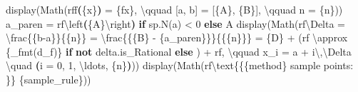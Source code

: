 \documentclass[
  letterpaper,
  DIV=11,
  numbers=noendperiod]{scrreprt}
\newenvironment{Shaded}{\begin{snugshade}}{\end{snugshade}}
\newcommand{\CharTok}[1]{\textcolor[rgb]{0.13,0.47,0.30}{#1}}
\newcommand{\ControlFlowTok}[1]{\textcolor[rgb]{0.00,0.23,0.31}{\textbf{#1}}}
\newcommand{\DecValTok}[1]{\textcolor[rgb]{0.68,0.00,0.00}{#1}}
\newcommand{\ErrorTok}[1]{\textcolor[rgb]{0.68,0.00,0.00}{#1}}
\newcommand{\KeywordTok}[1]{\textcolor[rgb]{0.00,0.23,0.31}{\textbf{#1}}}
\newcommand{\NormalTok}[1]{\textcolor[rgb]{0.00,0.23,0.31}{#1}}
\newcommand{\OperatorTok}[1]{\textcolor[rgb]{0.37,0.37,0.37}{#1}}
\newcommand{\PreprocessorTok}[1]{\textcolor[rgb]{0.68,0.00,0.00}{#1}}
\newcommand{\SpecialCharTok}[1]{\textcolor[rgb]{0.37,0.37,0.37}{#1}}
\newcommand{\StringTok}[1]{\textcolor[rgb]{0.13,0.47,0.30}{#1}}
\newcommand{\VerbatimStringTok}[1]{\textcolor[rgb]{0.13,0.47,0.30}{#1}}
\theoremstyle{plain}
\theoremstyle{plain}
\theoremstyle{definition}
\theoremstyle{definition}
\theoremstyle{definition}
\theoremstyle{plain}
\theoremstyle{plain}
\theoremstyle{remark}
\begin{document}
\begin{Shaded}
\begin{Highlighting}[]
\NormalTok{    display(Math(}\VerbatimStringTok{rf\textquotesingle{}f}\KeywordTok{(}\SpecialCharTok{\{}\NormalTok{x}\SpecialCharTok{\}}\KeywordTok{)}\VerbatimStringTok{ = }\SpecialCharTok{\{}\NormalTok{fx}\SpecialCharTok{\}}\VerbatimStringTok{, }\ErrorTok{\textbackslash{}}\VerbatimStringTok{qquad }\PreprocessorTok{[a, b]}\VerbatimStringTok{ = }\PreprocessorTok{[}\SpecialCharTok{\{}\NormalTok{A}\SpecialCharTok{\}}\PreprocessorTok{, }\SpecialCharTok{\{}\NormalTok{B}\SpecialCharTok{\}}\PreprocessorTok{]}\VerbatimStringTok{, }\ErrorTok{\textbackslash{}}\VerbatimStringTok{qquad n = }\SpecialCharTok{\{}\NormalTok{n}\SpecialCharTok{\}}\VerbatimStringTok{\textquotesingle{}}\NormalTok{))}
\NormalTok{    a\_paren }\OperatorTok{=} \VerbatimStringTok{rf\textquotesingle{}}\ErrorTok{\textbackslash{}}\VerbatimStringTok{left}\KeywordTok{(}\SpecialCharTok{\{}\NormalTok{A}\SpecialCharTok{\}}\CharTok{\textbackslash{}r}\VerbatimStringTok{ight}\KeywordTok{)}\VerbatimStringTok{\textquotesingle{}} \ControlFlowTok{if}\NormalTok{ sp.N(a) }\OperatorTok{\textless{}} \DecValTok{0} \ControlFlowTok{else}\NormalTok{ A}
\NormalTok{    display(Math(}\VerbatimStringTok{rf\textquotesingle{}}\DecValTok{\textbackslash{}D}\VerbatimStringTok{elta = }\CharTok{\textbackslash{}f}\VerbatimStringTok{rac}\CharTok{\{\{}\VerbatimStringTok{b{-}a}\CharTok{\}\}\{\{}\VerbatimStringTok{n}\CharTok{\}\}}\VerbatimStringTok{ = }\CharTok{\textbackslash{}f}\VerbatimStringTok{rac}\CharTok{\{\{}\SpecialCharTok{\{}\NormalTok{B}\SpecialCharTok{\}}\VerbatimStringTok{ {-} }\SpecialCharTok{\{}\NormalTok{a\_paren}\SpecialCharTok{\}}\CharTok{\}\}\{\{}\SpecialCharTok{\{}\NormalTok{n}\SpecialCharTok{\}}\CharTok{\}\}}\VerbatimStringTok{ = }\SpecialCharTok{\{}\NormalTok{D}\SpecialCharTok{\}}\VerbatimStringTok{\textquotesingle{}}
                 \OperatorTok{+}\NormalTok{ (}\VerbatimStringTok{rf\textquotesingle{} }\CharTok{\textbackslash{}a}\VerbatimStringTok{pprox }\SpecialCharTok{\{}\NormalTok{\_fmt(d\_f)}\SpecialCharTok{\}}\VerbatimStringTok{\textquotesingle{}} \ControlFlowTok{if} \KeywordTok{not}\NormalTok{ delta.is\_Rational }\ControlFlowTok{else} \StringTok{\textquotesingle{}\textquotesingle{}}\NormalTok{)}
                 \OperatorTok{+} \VerbatimStringTok{rf\textquotesingle{}, }\ErrorTok{\textbackslash{}}\VerbatimStringTok{qquad x\_i = a }\OperatorTok{+}\VerbatimStringTok{ i}\CharTok{\textbackslash{},}\DecValTok{\textbackslash{}D}\VerbatimStringTok{elta }\ErrorTok{\textbackslash{}}\VerbatimStringTok{quad }\KeywordTok{(}\VerbatimStringTok{i = 0, 1, }\ErrorTok{\textbackslash{}}\VerbatimStringTok{ldots, }\SpecialCharTok{\{}\NormalTok{n}\SpecialCharTok{\}}\KeywordTok{)}\VerbatimStringTok{\textquotesingle{}}\NormalTok{))}
\NormalTok{    display(Math(}\VerbatimStringTok{rf\textquotesingle{}}\CharTok{\textbackslash{}t}\VerbatimStringTok{ext}\CharTok{\{\{}\SpecialCharTok{\{}\NormalTok{method}\SpecialCharTok{\}}\VerbatimStringTok{ sample points: }\CharTok{\}\}}\VerbatimStringTok{ }\SpecialCharTok{\{}\NormalTok{sample\_rule}\SpecialCharTok{\}}\VerbatimStringTok{\textquotesingle{}}\NormalTok{))}


\end{Highlighting}
\end{Shaded}
\end{document}
